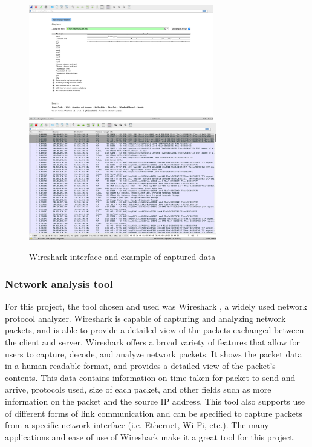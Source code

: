\documentclass[10pt,sigconf,letterpaper,nonacm]{acmart}
\begin{document}
\begin{figure}[t]
  \centering
  \includegraphics[width=0.72\textwidth]{Figures_and_Graphs/WiresharkFigure.png}
  \includegraphics[width=0.73\textwidth]{Figures_and_Graphs/WiresharkDataFigure.png}
  \caption{Wireshark interface and example of captured data}
  \label{fig:Wireshark}
\end{figure}

\subsubsection{Network analysis tool} For this project, the tool chosen and used was Wireshark \cite{Wireshark}, a widely used network protocol analyzer. Wireshark is capable of capturing and analyzing network packets, and is able to provide a detailed
 view of the packets exchanged between the client and server. Wireshark offers a broad variety of features that allow for users to capture, decode, and analyze network packets. It shows the packet data in a human-readable format, and provides a detailed view of the packet's contents.
 This data contains information on time taken for packet to send and arrive, protocols used, size of each packet, and other fields such as more information on the packet and the source IP address. This tool also supports use of different forms of link communication and can be specified to capture packets from a specific network interface (i.e. Ethernet, Wi-Fi, etc.). 
 The many applications and ease of use of Wireshark make it a great tool for this project.
 
\end{document}
